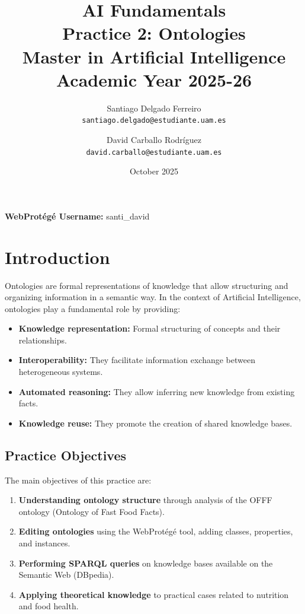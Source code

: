 \documentclass[12pt,a4paper]{article}
\title{
    \textbf{AI Fundamentals}\\
    \Large Practice 2: Ontologies\\
    \large Master in Artificial Intelligence\\
    \normalsize Academic Year 2025-26
}
\author{
    Santiago Delgado Ferreiro\\
    \texttt{santiago.delgado@estudiante.uam.es}
    \and
    David Carballo Rodríguez\\
    \texttt{david.carballo@estudiante.uam.es}
}
\date{October 2025}
\begin{document}
\maketitle

\vfill

\begin{center}
\vspace{0.5cm}
\textbf{WebProtégé Username:} santi\_david
\end{center}

\newpage

\tableofcontents
\newpage

\setcounter{page}{1}

\section{Introduction}

Ontologies are formal representations of knowledge that allow structuring and organizing information in a semantic way. In the context of Artificial Intelligence, ontologies play a fundamental role by providing:

\begin{itemize}
    \item \textbf{Knowledge representation:} Formal structuring of concepts and their relationships.
    \item \textbf{Interoperability:} They facilitate information exchange between heterogeneous systems.
    \item \textbf{Automated reasoning:} They allow inferring new knowledge from existing facts.
    \item \textbf{Knowledge reuse:} They promote the creation of shared knowledge bases.
\end{itemize}

\subsection{Practice Objectives}

The main objectives of this practice are:

\begin{enumerate}
    \item \textbf{Understanding ontology structure} through analysis of the OFFF ontology (Ontology of Fast Food Facts).
    \item \textbf{Editing ontologies} using the WebProtégé tool, adding classes, properties, and instances.
    \item \textbf{Performing SPARQL queries} on knowledge bases available on the Semantic Web (DBpedia).
    \item \textbf{Applying theoretical knowledge} to practical cases related to nutrition and food health.
\end{enumerate}
\end{document}
